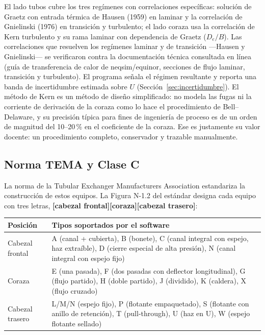\documentclass[11pt,a4paper]{article}
\begin{document}
El lado tubos cubre los tres reg\'imenes con correlaciones espec\'ificas:
soluci\'on de Graetz con entrada t\'ermica de Hausen (1959)\cite{hausen} en laminar y la
correlaci\'on de Gnielinski (1976)\cite{gnielinski} en transici\'on y turbulento; el lado coraza
usa la correlaci\'on de Kern turbulento y su rama laminar con dependencia de
Graetz ($D_e/B$). Las correlaciones que resuelven los reg\'imenes laminar y de
transici\'on ---Hausen y Gnielinski--- se verificaron contra la documentaci\'on
t\'ecnica consultada en l\'inea (gu\'ia de transferencia de calor de
neqsim/equinor\cite{guia}, secciones de flujo laminar, transici\'on y turbulento). El
programa se\~nala el r\'egimen resultante y reporta una banda de
incertidumbre estimada sobre $U$ (Secci\'on~\ref{sec:incertidumbre}). El
m\'etodo de Kern es un m\'etodo de dise\~no simplificado: no modela las fugas ni
la corriente de derivaci\'on de la coraza como lo hace el procedimiento de
Bell--Delaware, y su precisi\'on t\'ipica para fines de ingenier\'ia de proceso
es de un orden de magnitud del 10--20\,\% en el coeficiente de la coraza. Ese
es justamente su valor docente: un procedimiento completo, conservador y
trazable manualmente.

\subsection{Norma TEMA y Clase C}

La norma de la Tubular Exchanger Manufacturers Association \cite{tema}
estandariza la construcci\'on de estos equipos. La Figura N-1.2 del est\'andar
designa cada equipo con tres letras, \textbf{[cabezal frontal][coraza][cabezal
trasero]}:

\begin{center}
{\small
\begin{tabular}{@{}p{3.2cm}p{11.4cm}@{}}
\toprule
\textbf{Posici\'on} & \textbf{Tipos soportados por el software} \\
\midrule
Cabezal frontal & A (canal + cubierta), B (bonete), C (canal integral con
espejo, haz extra\'ible), D (cierre especial de alta presi\'on), N (canal
integral con espejo fijo) \\
Coraza & E (una pasada), F (dos pasadas con deflector longitudinal),
G (flujo partido), H (doble partido), J (dividido), K (caldera),
X (flujo cruzado) \\
Cabezal trasero & L/M/N (espejo fijo), P (flotante empaquetado),
S (flotante con anillo de retenci\'on), T (pull-through), U (haz en U),
W (espejo flotante sellado) \\
\bottomrule
\end{tabular}}
\end{center}
\end{document}
